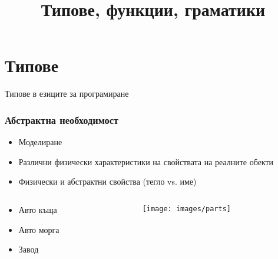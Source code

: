 \documentclass{beamer}
\begin{document}
\title[Увод в програмирането]{Типове, функции, граматики}
\frame{\titlepage}


\section{Типове}


\begin{frame}
\centerline{Типове в езиците за програмиране}
\end{frame}



\begin{frame}[fragile]
\frametitle{Абстрактна необходимост}



\begin{itemize}
\item Моделиране
\pause
\item Различни физически характеристики на свойствата на реалните обекти
\pause
\item Физически и абстрактни свойства (тегло vs. име)

\end{itemize}

\pause


\begin{columns}[t]
  \begin{column}{0.4\textwidth}
\begin{itemize}
  \item Авто къща
  \item Авто морга
  \item Завод
\end{itemize}

  \end{column}
  \begin{column}{0.6\textwidth}

\texttt{[image: images/parts]}

  \end{column}
\end{columns}



\end{frame}
\end{document}
